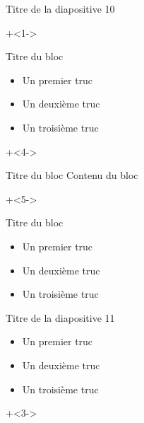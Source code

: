 \documentclass[10pt]{beamer}
\begin{document}
\begin{frame}{Titre de la diapositive 10}
    
\onslide+<1->

    \begin{block}{Titre du bloc}
\begin{itemize}[<+- | alert@+>]
      	\item Un premier truc
		\item Un deuxième truc
		\item Un troisième truc
\end{itemize}
    \end{block}
    
\onslide+<4->

    \begin{block}{Titre du bloc}
        Contenu du bloc
    \end{block}
    \onslide+<5->

    \begin{block}{Titre du bloc}
\begin{itemize}[<+(1)- | alert@+(1)>]
      	\item Un premier truc
		\item Un deuxième truc
		\item Un troisième truc
\end{itemize}
    \end{block}

\end{frame}

\begin{frame}[fragile]{Titre de la diapositive 11}
\begin{itemize}[<+- | alert@+>]
      	\item Un premier truc
		\item Un deuxième truc
		\item Un troisième truc
\end{itemize}
    	\onslide+<3->
    \begin{center}
	\end{center}
\end{frame}
\end{document}
